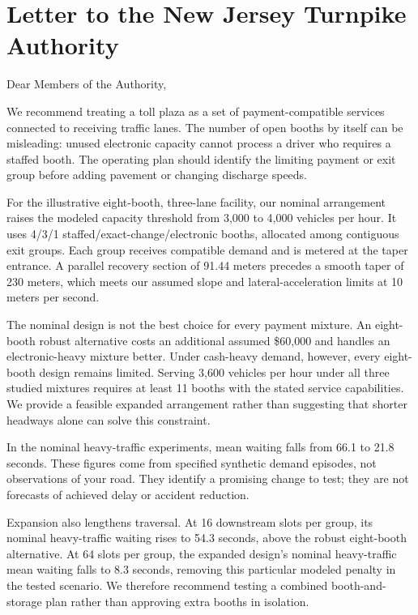 \documentclass[12pt,letterpaper]{article}
\begin{document}
\clearpage\section*{Letter to the New Jersey Turnpike Authority}
\noindent Dear Members of the Authority,

We recommend treating a toll plaza as a set of payment-compatible services connected to receiving traffic lanes. The number of open booths by itself can be misleading: unused electronic capacity cannot process a driver who requires a staffed booth. The operating plan should identify the limiting payment or exit group before adding pavement or changing discharge speeds.

For the illustrative eight-booth, three-lane facility, our nominal arrangement raises the modeled capacity threshold from 3,000 to 4,000 vehicles per hour. It uses 4/3/1 staffed/exact-change/electronic booths, allocated among contiguous exit groups. Each group receives compatible demand and is metered at the taper entrance. A parallel recovery section of 91.44 meters precedes a smooth taper of 230 meters, which meets our assumed slope and lateral-acceleration limits at 10 meters per second.

The nominal design is not the best choice for every payment mixture. An eight-booth robust alternative costs an additional assumed \$60,000 and handles an electronic-heavy mixture better. Under cash-heavy demand, however, every eight-booth design remains limited. Serving 3,600 vehicles per hour under all three studied mixtures requires at least 11 booths with the stated service capabilities. We provide a feasible expanded arrangement rather than suggesting that shorter headways alone can solve this constraint.

In the nominal heavy-traffic experiments, mean waiting falls from 66.1 to 21.8 seconds. These figures come from specified synthetic demand episodes, not observations of your road. They identify a promising change to test; they are not forecasts of achieved delay or accident reduction.

Expansion also lengthens traversal. At 16 downstream slots per group, its nominal heavy-traffic waiting rises to 54.3 seconds, above the robust eight-booth alternative. At 64 slots per group, the expanded design's nominal heavy-traffic mean waiting falls to 8.3 seconds, removing this particular modeled penalty in the tested scenario. We therefore recommend testing a combined booth-and-storage plan rather than approving extra booths in isolation.
\end{document}
